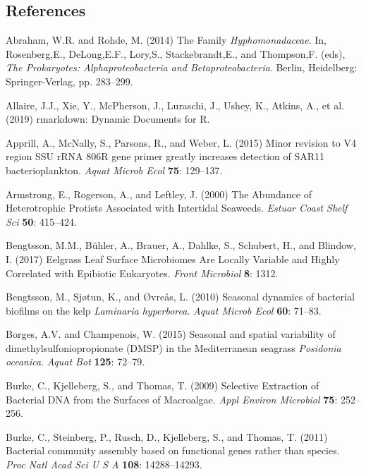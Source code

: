 \documentclass[12pt,]{article}
\begin{document}
\hypertarget{references}{%
\subsection{References}\label{references}}

\hypertarget{refs}{}
\leavevmode\hypertarget{ref-Abraham2014}{}%
Abraham, W.R. and Rohde, M. (2014) The Family \emph{Hyphomonadaceae}.
In, Rosenberg,E., DeLong,E.F., Lory,S., Stackebrandt,E., and Thompson,F.
(eds), \emph{The Prokaryotes: Alphaproteobacteria and
Betaproteobacteria}. Berlin, Heidelberg: Springer-Verlag, pp. 283--299.

\leavevmode\hypertarget{ref-Allaire2019}{}%
Allaire, J.J., Xie, Y., McPherson, J., Luraschi, J., Ushey, K., Atkins,
A., et al. (2019) rmarkdown: Dynamic Documents for R.

\leavevmode\hypertarget{ref-Apprill2015}{}%
Apprill, A., McNally, S., Parsons, R., and Weber, L. (2015) Minor
revision to V4 region SSU rRNA 806R gene primer greatly increases
detection of SAR11 bacterioplankton. \emph{Aquat Microb Ecol}
\textbf{75}: 129--137.

\leavevmode\hypertarget{ref-Armstrong2000}{}%
Armstrong, E., Rogerson, A., and Leftley, J. (2000) The Abundance of
Heterotrophic Protists Associated with Intertidal Seaweeds. \emph{Estuar
Coast Shelf Sci} \textbf{50}: 415--424.

\leavevmode\hypertarget{ref-Bengtsson2017}{}%
Bengtsson, M.M., Bühler, A., Brauer, A., Dahlke, S., Schubert, H., and
Blindow, I. (2017) Eelgrass Leaf Surface Microbiomes Are Locally
Variable and Highly Correlated with Epibiotic Eukaryotes. \emph{Front
Microbiol} \textbf{8}: 1312.

\leavevmode\hypertarget{ref-Bengtsson2010}{}%
Bengtsson, M., Sjøtun, K., and Øvreås, L. (2010) Seasonal dynamics of
bacterial biofilms on the kelp \emph{Laminaria hyperborea}. \emph{Aquat
Microb Ecol} \textbf{60}: 71--83.

\leavevmode\hypertarget{ref-Borges2015}{}%
Borges, A.V. and Champenois, W. (2015) Seasonal and spatial variability
of dimethylsulfoniopropionate (DMSP) in the Mediterranean seagrass
\emph{Posidonia oceanica}. \emph{Aquat Bot} \textbf{125}: 72--79.

\leavevmode\hypertarget{ref-Burke2009}{}%
Burke, C., Kjelleberg, S., and Thomas, T. (2009) Selective Extraction of
Bacterial DNA from the Surfaces of Macroalgae. \emph{Appl Environ
Microbiol} \textbf{75}: 252--256.

\leavevmode\hypertarget{ref-Burke2011a}{}%
Burke, C., Steinberg, P., Rusch, D., Kjelleberg, S., and Thomas, T.
(2011) Bacterial community assembly based on functional genes rather
than species. \emph{Proc Natl Acad Sci U S A} \textbf{108}:
14288--14293.
\end{document}
